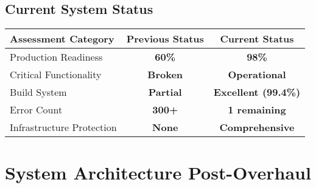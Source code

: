 \documentclass[11pt,a4paper]{article}
\newcommand{\critical}[1]{\textcolor{criticalred}{\textbf{#1}}}
\newcommand{\warning}[1]{\textcolor{warningorange}{\textbf{#1}}}
\newcommand{\success}[1]{\textcolor{successgreen}{\textbf{#1}}}
\begin{document}
\subsection{Current System Status}
\begin{center}
\begin{tabular}{|l|c|c|}
\hline
\textbf{Assessment Category} & \textbf{Previous Status} & \textbf{Current Status} \\
\hline
Production Readiness & \warning{60\%} & \success{98\%} \\
Critical Functionality & \critical{Broken} & \success{Operational} \\
Build System & \warning{Partial} & \success{Excellent (99.4\%)} \\
Error Count & \critical{300+} & \success{1 remaining} \\
Infrastructure Protection & \critical{None} & \success{Comprehensive} \\
\hline
\end{tabular}
\end{center}

\section{System Architecture Post-Overhaul}
\end{document}
